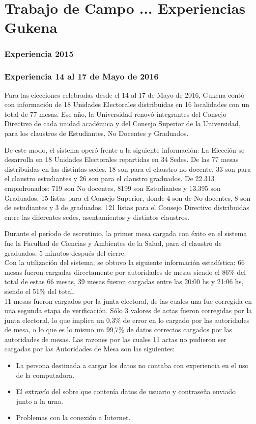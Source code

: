 \label{Gukena2}
\chapter{Trabajo de Campo ... Experiencias Gukena}

\subsection{Experiencia 2015}
\subsection{Experiencia 14 al 17 de Mayo de 2016}
Para las elecciones celebradas desde el 14 al 17 de Mayo de 2016, Gukena contó con información de 18 Unidades Electorales distribuidas en 16 localidades con un total de 77 mesas. 
Ese año, la Universidad renovó integrantes del Consejo Directivo de cada unidad académica y del Consejo Superior de la Universidad, para los claustros de Estudiantes, No Docentes y Graduados. 

De este modo, el sistema operó frente a la siguiente información:
La Elección se desarrolla en 18 Unidades Electorales repartidas en 34 Sedes.
De las 77 mesas distribuidas en las distintas sedes, 18 son para el claustro no docente, 33 son para el claustro estudiantes y 26 son para el claustro graduados.
De 22.313 empadronados: 719 son No docentes, 8199 son Estudiantes y 13.395 son Graduados. %
15 listas para el Consejo Superior, donde 4 son de No docentes, 8 son de estudiantes y 3 de graduados.
121 listas para el Consejo Directivo distribuidas entre las diferentes sedes, asentamientos y distintos claustros.

Durante el período de escrutinio, la primer mesa cargada con éxito en el sistema fue la Facultad de Ciencias y Ambientes de la Salud, para el claustro de graduados, 5 minutos después del cierre.\\ 
Con la utilización del sistema, se obtuvo la siguiente información estadística:
66 mesas fueron cargadas directamente por autoridades de mesas siendo el 86\% del total
de estas 66 mesas, 39 mesas fueron cargadas entre las 20:00 hs y 21:06 hs, siendo el 51\% del total.\\
11 mesas fueron cargados por la junta electoral, de las cuales una fue corregida en una segunda etapa de verificación.
Sólo 3 valores de actas fueron corregidas por la junta electoral, lo que implica un 0,3\% de error en lo cargado por las autoridades de mesa, o lo que es lo mismo un 99,7\% de datos correctos cargados por las autoridades de mesas.
Las razones por las cuales 11 actas no pudieron ser cargadas por las Autoridades de Mesa son las siguientes:
\begin{itemize}
\item La persona destinada a cargar los datos no contaba con experiencia en el uso de la computadora.
\item El extravío del sobre que contenía datos de usuario y contraseña enviado junto a la urna.
\item Problemas con la conexión a Internet.
\end{itemize}

